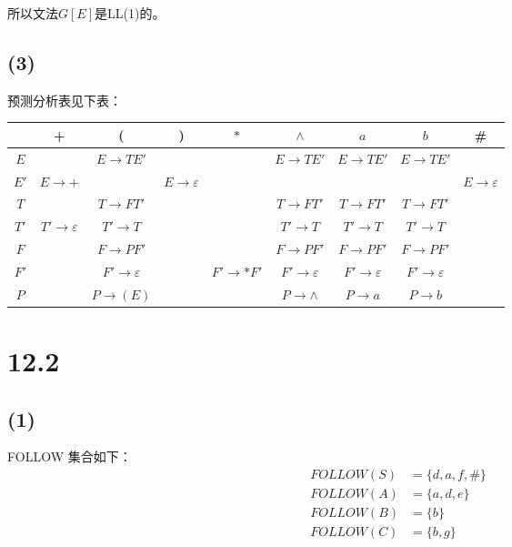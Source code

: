 \documentclass[UTF8]{ctexart}
\begin{document}
        所以文法$G[E]$是LL(1)的。

    \subsection*{(3)}

        预测分析表见下表：

        \begin{tabular}{|c|c|c|c|c|c|c|c|c|}
            \hline
            & + & ( & ) & $*$ & $\wedge$ & $a$ & $b$ & \# \\
            \hline
            $E$ & & $E\to TE'$ & & & $E\to TE'$ & $E\to TE'$ & $E\to TE'$ & \\
            \hline
            $E'$ & $E\to +$ & & $E\to \varepsilon$ & & & & & $E\to \varepsilon$ \\
            \hline
            $T$ & & $T\to FT'$ & & & $T\to FT'$ & $T\to FT'$ & $T\to FT'$ & \\
            \hline
            $T'$ & $T'\to \varepsilon$ & $T'\to T$ & & & $T'\to T$ & $T'\to T$ & $T'\to T$ & \\
            \hline
            $F$ & & $F\to PF'$ & & & $F\to PF'$ &$F\to PF'$ &$F\to PF'$ & \\
            \hline
            $F'$ & & $F'\to \varepsilon$ & & $F'\to *F'$ & $F'\to \varepsilon$ &$F'\to \varepsilon$ &$F'\to \varepsilon$ & \\
            \hline
            $P$ & & $P\to (E)$ & & & $P\to\wedge$ & $P\to a$ & $P\to b$ & \\
            \hline
        \end{tabular}

\section*{12.2}

    \subsection*{(1)}
        FOLLOW 集合如下：
        \begin{align*}
            FOLLOW(S) &= \{d, a, f, \#\} \\
            FOLLOW(A) &= \{a, d, e\} \\
            FOLLOW(B) &= \{b\} \\
            FOLLOW(C) &= \{b, g\}
        \end{align*}
\end{document}
